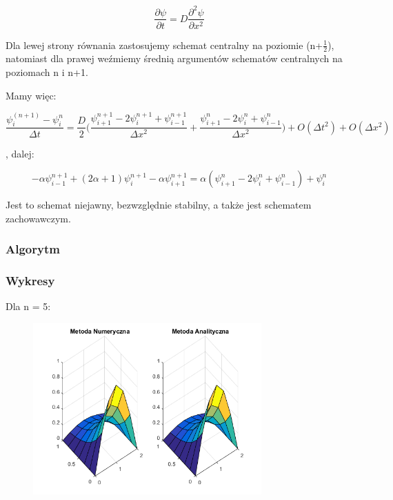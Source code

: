 $$\dfrac{\partial \psi}{\partial t} = D\dfrac{\partial^2 \psi}{\partial x^2}$$

Dla lewej strony równania zastosujemy schemat centralny na poziomie (n+$\frac{1}{2}$), natomiast dla prawej weźmiemy średnią argumentów schematów centralnych na poziomach n i n+1.

Mamy więc:

$$\dfrac{\psi^{(n+1)}_{i}-\psi^n_{i}}{\Delta t}=\dfrac{D}{2}\Bigg(\dfrac{\psi^{n+1}_{i+1}-2\psi^{n+1}_{i}+\psi^{n+1}_{i-1}}{\Delta x^2} + \dfrac{\psi^{n}_{i+1}-2\psi^{n}_{i}+\psi^{n}_{i-1}}{\Delta x^2}\Bigg) + O(\Delta t^2) + O(\Delta x^2) $$

, dalej:

$$-\alpha\psi^{n+1}_{i-1}+(2\alpha+1)\psi^{n+1}_{i}-\alpha\psi^{n+1}_{i+1}=\alpha(\psi^{n}_{i+1}-2\psi^{n}_{i}+\psi^{n}_{i-1})+\psi^{n}_{i}$$

Jest to schemat niejawny, bezwzględnie stabilny, a także jest schematem zachowawczym.

\newpage

\subsubsection{Algorytm}

\newpage
\subsubsection{Wykresy}

Dla n = 5:

\begin{figure}[!ht]
	\begin{center}
		\includegraphics[width=0.78\textwidth]{Lab7/charts/cn/5.png}
	\end{center}
\end{figure}

